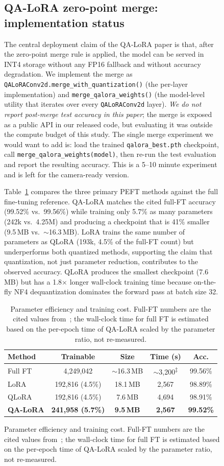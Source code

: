 \documentclass[conference]{IEEEtran}
\begin{document}
\begin{figure}[htbp]
\subsection{QA-LoRA zero-point merge: implementation status}
The central deployment claim of the QA-LoRA paper is that, after the zero-point merge rule is applied, the model can be served in INT4 storage without any FP16 fallback and without accuracy degradation. We implement the merge as \texttt{QALoRAConv2d.merge\_with\_quantization()} (the per-layer implementation) and \texttt{merge\_qalora\_weights()} (the model-level utility that iterates over every \texttt{QALoRAConv2d} layer). \emph{We do not report post-merge test accuracy in this paper}; the merge is exposed as a public API in our released code, but evaluating it was outside the compute budget of this study. The single merge experiment we would want to add is: load the trained \texttt{qalora\_best.pth} checkpoint, call \texttt{merge\_qalora\_weights(model)}, then re-run the test evaluation and report the resulting accuracy. This is a 5--10 minute experiment and is left for the camera-ready version.

Table~\ref{tab:efficiency} compares the three primary PEFT methods against the full fine-tuning reference. QA-LoRA matches the cited full-FT accuracy (99.52\% vs.\ 99.56\%) while training only 5.7\% as many parameters (242k vs.\ 4.25M) and producing a checkpoint that is 41\% smaller (9.5\,MB vs.\ $\sim$16.3\,MB). LoRA trains the same number of parameters as QLoRA (193k, 4.5\% of the full-FT count) but underperforms both quantized methods, supporting the claim that quantization, not just parameter reduction, contributes to the observed accuracy. QLoRA produces the smallest checkpoint (7.6\,MB) but has a 1.8$\times$ longer wall-clock training time because on-the-fly NF4 dequantization dominates the forward pass at batch size 32.

\begin{table}[htbp]
\caption{Parameter efficiency and training cost. Full-FT numbers are the cited values from~\cite{atila2021}; the wall-clock time for full FT is estimated based on the per-epoch time of QA-LoRA scaled by the parameter ratio, not re-measured.}
\begin{center}
\begin{tabular}{|l|c|c|c|c|}
\hline
\textbf{Method} & \textbf{Trainable} & \textbf{Size} & \textbf{Time (s)} & \textbf{Acc.} \\
\hline
Full FT~\cite{atila2021} & 4{,}249{,}042 & $\sim$16.3\,MB & $\sim$3{,}200\textsuperscript{$\ddagger$} & 99.56\% \\
LoRA     & 192{,}816 (4.5\%)  & 18.1\,MB & 2{,}567 & 98.89\% \\
QLoRA    & 192{,}816 (4.5\%)  &  7.6\,MB & 4{,}694 & 98.91\% \\
\textbf{QA-LoRA} & \textbf{241{,}958 (5.7\%)} & \textbf{9.5\,MB} & \textbf{2{,}567} & \textbf{99.52\%} \\
\hline
\end{tabular}
\label{tab:efficiency}
\end{center}
\end{table}


\end{figure}
\end{document}
